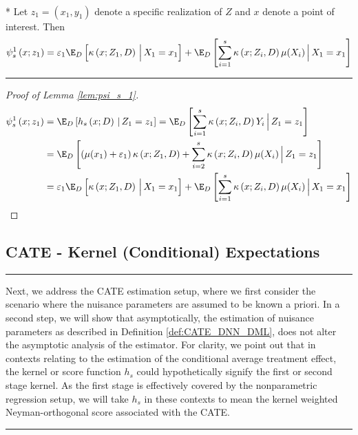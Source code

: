 \begin{lem}\label{lem:psi_s_1}\mbox{}\\*
	Let $z_1 = (x_1, y_1)$ denote a specific realization of $Z$ and $x$ denote a point of interest.
	Then
	\begin{equation}
		\psi_{s}^{1}\left(x; z_1\right)
		= \varepsilon_1 \E_D\left[\kappa\left(x; Z_1, D\right)\, \Big| \, X_1 = x_1 \right]
		+ \E_{D}\left[\sum_{i = 1}^{s} \kappa\left(x; Z_{i}, D\right) \mu(X_{i})\, \Big| \, X_1 = x_1 \right]
	\end{equation}
\end{lem}
\hrule
\begin{proof}[Proof of Lemma \ref{lem:psi_s_1}]
	\begin{equation}
		\begin{aligned}
			\psi_{s}^{1}\left(x; z_1\right)
			 & = \E_{D}\left[h_{s}\left(x; D\right) \, | \, Z_1 = z_1 \right]
			= \E_{D}\left[\sum_{i = 1}^{s} \kappa\left(x; Z_{i}, D\right) Y_{i} \, \Big| \, Z_1 = z_1 \right]  \\
			 & = \E_{D}\left[\left(\mu(x_1) + \varepsilon_1\right)\kappa\left(x; Z_1, D\right)
			+ \sum_{i = 2}^{s} \kappa\left(x; Z_{i}, D\right) \mu(X_{i})\, \Big| \, Z_1 = z_1 \right] \\
			 & = \varepsilon_1 \E_D\left[\kappa\left(x; Z_1, D\right)\, \Big| \, X_1 = x_1 \right]
			+ \E_{D}\left[\sum_{i = 1}^{s} \kappa\left(x; Z_{i}, D\right) \mu(X_{i})\, \Big| \, X_1 = x_1 \right]
		\end{aligned}
	\end{equation}
\end{proof}

\newpage
\subsection{CATE - Kernel (Conditional) Expectations}
\hrule
Next, we address the CATE estimation setup, where we first consider the scenario where the nuisance parameters are assumed to be known a priori.
In a second step, we will show that asymptotically, the estimation of nuisance parameters as described in Definition \ref{def:CATE_DNN_DML}, does not alter the asymptotic analysis of the estimator.
For clarity, we point out that in contexts relating to the estimation of the conditional average treatment effect, the kernel or score function $h_s$ could hypothetically signify the first or second stage kernel.
As the first stage is effectively covered by the nonparametric regression setup, we will take $h_s$ in these contexts to mean the kernel weighted Neyman-orthogonal score associated with the CATE.
\vspace{0.5cm}
\hrule


